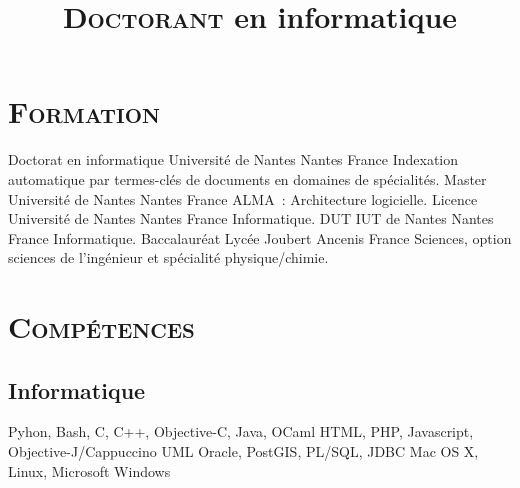 \documentclass[10pt, a4paper]{moderncv}
\title{\Large{\textsc{Doctorant}} \large{en informatique}}
\begin{document}
  \maketitle

  \section{\textsc{Formation}}
            {Doctorat en informatique}  %
            {Université de Nantes}      %
            {Nantes}                    %
            {France}                    %
            {Indexation automatique par termes-clés de documents en domaines de
            spécialités.}               %
            {Master}
            {Université de Nantes}
            {Nantes}
            {France}
            {ALMA~: Architecture logicielle.}
            {Licence}
            {Université de Nantes}
            {Nantes}
            {France}
            {Informatique.}
            {DUT}
            {IUT de Nantes}
            {Nantes}
            {France}
            {Informatique.}
            {Baccalauréat}
            {Lycée Joubert}
            {Ancenis}
            {France}
            {Sciences, option sciences de l'ingénieur et spécialité
             physique/chimie.}

  \section{\textsc{Compétences}}
    \subsection{Informatique}
             {Pyhon, Bash, C, C++, Objective-C, Java, OCaml}
             {HTML, PHP, Javascript, Objective-J/Cappuccino}
             {UML}
             {Oracle, PostGIS, PL/SQL, JDBC}
             {Mac OS X, Linux, Microsoft Windows}
\end{document}
